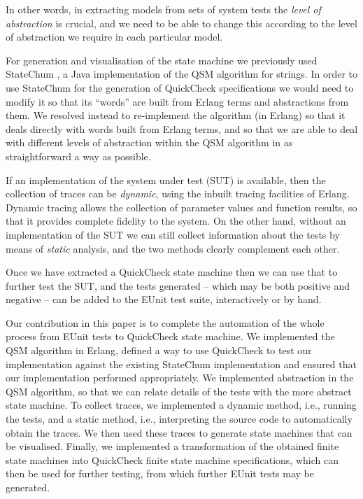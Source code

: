 \documentclass[]{sigplanconf}
\begin{document}
In other words, in extracting models from sets of system tests the \emph{level of abstraction} is crucial, and we need to be able to change this according to the level of abstraction we require in each particular model.
 
For generation and visualisation of the state machine we previously used StateChum \cite{arts2010test,statechum}, a Java implementation of the QSM algorithm for strings. In order to use StateChum for the generation of QuickCheck specifications we would need to modify it so that its ``words'' are built from Erlang terms and abstractions from them. We resolved instead to re-implement the algorithm (in Erlang) so that it deals directly with words built from Erlang terms, and so that we are able to deal with different levels of abstraction within the QSM algorithm in as straightforward a way as possible.

If an implementation of the system under test (SUT) is available, then the collection of traces can be \emph{dynamic}, using the inbuilt tracing facilities of Erlang. Dynamic tracing allows the collection of parameter values and function results, so that it provides complete fidelity to the system. On the other hand, without an implementation of the SUT we can still collect information about the tests by means of \emph{static} analysis, and the two methods clearly complement each other.

Once we have extracted a QuickCheck state machine then we can use that to further test the SUT, and the tests generated -- which may be both positive and negative -- can be added to the EUnit test suite, interactively or by hand.

Our contribution in this paper is to complete the automation of the whole process from EUnit tests to QuickCheck state machine. %
We implemented the QSM algorithm in Erlang, defined a way to use QuickCheck to test our implementation against the existing StateChum implementation and ensured that our implementation performed appropriately. We implemented abstraction in the QSM algorithm, so that we can relate details of the tests with the more abstract state machine. To collect traces, we implemented a dynamic method, i.e., running the tests, and a static method, i.e., interpreting the source code to automatically obtain the traces. We then used these traces to generate state machines that can be visualised. Finally, we implemented a transformation of the obtained finite state machines into QuickCheck finite state machine specifications, which can then be used for further testing, from which further EUnit tests may be generated.
\end{document}
